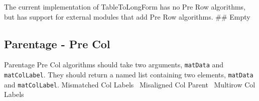 \documentclass[a4paper]{article}
\begin{document}
The current implementation of TableToLongForm has no Pre Row
algorithms, but has support for external modules that add Pre Row
algorithms.
\nwenddocs{}\endmoddef
## Empty
\nwendcode{}\nwdocspar

\subsection{Parentage - Pre Col}
Parentage Pre Col algorithms should take two arguments, \verb|matData|
and \verb|matColLabel|. They should return a named list containing two
elements, \verb|matData| and \verb|matColLabel|.
\nwenddocs{}\endmoddef
\LA{}Mismatched Col Labels~{\nwtagstyle{}}\RA{}
\LA{}Misaligned Col Parent~{\nwtagstyle{}}\RA{}
\LA{}Multirow Col Labels~{\nwtagstyle{}}\RA{}
\nwendcode{}\nwdocspar
\end{document}
